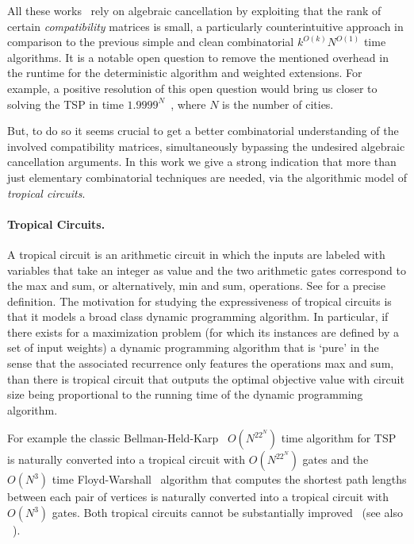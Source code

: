 \documentclass[11pt,a4paper]{article}
\begin{document}
All these works~\cite{CyganNPPRW22,BodlaenderCKN15,FominLPS16} rely on algebraic cancellation by exploiting that the rank of certain \emph{compatibility} matrices is small, a particularly counterintuitive approach in comparison to the previous simple and clean combinatorial $k^{O(k)}N^{O(1)}$ time algorithms. It is a notable open question to remove the mentioned overhead in the runtime for the deterministic algorithm and weighted extensions. For example, a positive resolution of this open question would bring us closer to solving the TSP in time $1.9999^N$~\cite{Nederlof20}, where $N$ is the number of cities.

But, to do so it seems crucial to get a better combinatorial understanding of the involved compatibility matrices, simultaneously bypassing the undesired algebraic cancellation arguments. In this work we give a strong indication that more than just elementary combinatorial techniques are needed, via the algorithmic model of \emph{tropical circuits}.

\paragraph{Tropical Circuits.} A tropical circuit is an arithmetic circuit in which the inputs are labeled with variables that take an integer as value and the two arithmetic gates correspond to the max and sum, or alternatively, min and sum, operations. See  for a precise definition. The motivation for studying the expressiveness of tropical circuits is that it models a broad class dynamic programming algorithm. In particular, if there exists for a maximization problem (for which its instances are defined by a set of input weights) a dynamic programming algorithm that is `pure' in the sense that the associated recurrence only features the operations max and sum, than there is tropical circuit that outputs the optimal objective value with circuit size being proportional to the running time of the dynamic programming algorithm.

For example the classic Bellman-Held-Karp~\cite{Bellman62,heldKarp} $O(N^22^N)$ time algorithm for TSP is naturally converted into a tropical circuit with $O(N^22^N)$ gates and the $O(N^3)$ time Floyd-Warshall~\cite{Floyd62a,Warshall62} algorithm that computes the shortest path lengths between each pair of vertices is naturally converted into a tropical circuit with $O(N^3)$ gates. Both tropical circuits cannot be substantially improved~\cite{JerrumS82,kerr1970effect} (see also ~\cite[Corollary~2.2]{Jukna2023}).
\end{document}
